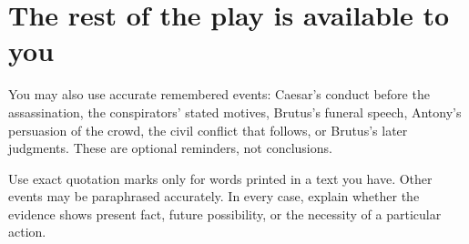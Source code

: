 \documentclass[11pt]{article}
\begin{document}
\section*{The rest of the play is available to you}
You may also use accurate remembered events: Caesar's conduct before the assassination, the conspirators' stated motives, Brutus's funeral speech, Antony's persuasion of the crowd, the civil conflict that follows, or Brutus's later judgments. These are optional reminders, not conclusions.

Use exact quotation marks only for words printed in a text you have. Other events may be paraphrased accurately. In every case, explain whether the evidence shows present fact, future possibility, or the necessity of a particular action.
\end{document}
